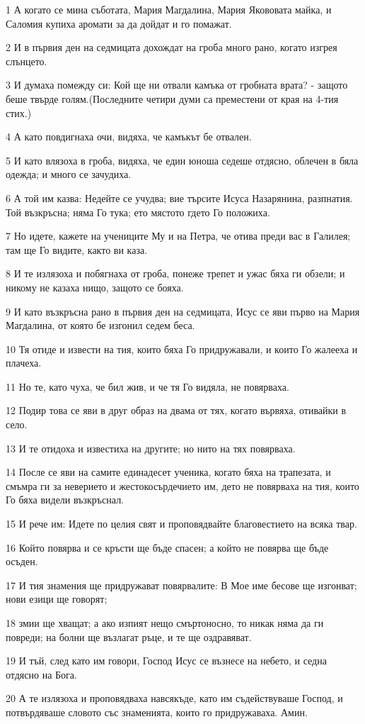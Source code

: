 \par 1 А когато се мина съботата, Мария Магдалина, Мария Якововата майка, и Саломия купиха аромати за да дойдат и го помажат.
\par 2 И в първия ден на седмицата дохождат на гроба много рано, когато изгрея слънцето.
\par 3 И думаха помежду си: Кой ще ни отвали камъка от гробната врата? - защото беше твърде голям.(Последните четири думи са преместени от края на 4-тия стих.)
\par 4 А като повдигнаха очи, видяха, че камъкът бе отвален.
\par 5 И като влязоха в гроба, видяха, че един юноша седеше отдясно, облечен в бяла одежда; и много се зачудиха.
\par 6 А той им казва: Недейте се учудва; вие търсите Исуса Назарянина, разпнатия. Той възкръсна; няма Го тука; ето мястото гдето Го положиха.
\par 7 Но идете, кажете на учениците Му и на Петра, че отива преди вас в Галилея; там ще Го видите, както ви каза.
\par 8 И те излязоха и побягнаха от гроба, понеже трепет и ужас бяха ги обзели; и никому не казаха нищо, защото се бояха.
\par 9 И като възкръсна рано в първия ден на седмицата, Исус се яви първо на Мария Магдалина, от която бе изгонил седем беса.
\par 10 Тя отиде и извести на тия, които бяха Го придружавали, и които Го жалееха и плачеха.
\par 11 Но те, като чуха, че бил жив, и че тя Го видяла, не повярваха.
\par 12 Подир това се яви в друг образ на двама от тях, когато вървяха, отивайки в село.
\par 13 И те отидоха и известиха на другите; но нито на тях повярваха.
\par 14 После се яви на самите единадесет ученика, когато бяха на трапезата, и смъмра ги за неверието и жестокосърдечието им, дето не повярваха на тия, които Го бяха видели възкръснал.
\par 15 И рече им: Идете по целия свят и проповядвайте благовестието на всяка твар.
\par 16 Който повярва и се кръсти ще бъде спасен; а който не повярва ще бъде осъден.
\par 17 И тия знамения ще придружават повярвалите: В Мое име бесове ще изгонват; нови езици ще говорят;
\par 18 змии ще хващат; а ако изпият нещо смъртоносно, то никак няма да ги повреди; на болни ще възлагат ръце, и те ще оздравяват.
\par 19 И тъй, след като им говори, Господ Исус се възнесе на небето, и седна отдясно на Бога.
\par 20 А те излязоха и проповядваха навсякъде, като им съдействуваше Господ, и потвърдяваше словото със знаменията, които го придружаваха. Амин.

